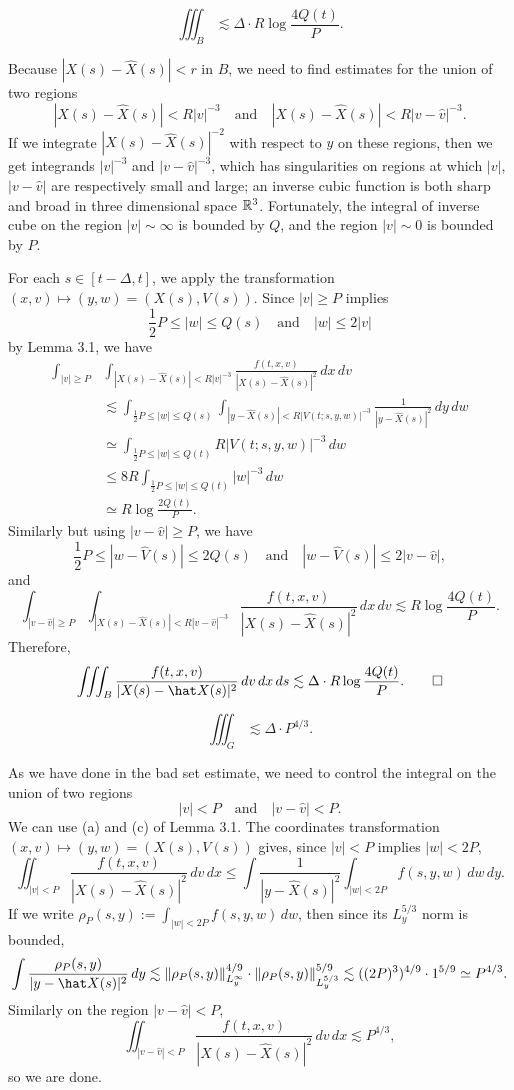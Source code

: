 \documentclass{article}
\begin{document}
\begin{prop}
\[\iiint_B\lesssim\Delta\cdot R\log\frac{4Q(t)}P.\]
\end{prop}
\begin{pf}
Because $|X(s)-\hat X(s)|<r$ in $B$, we need to find estimates for the union of two regions
\[|X(s)-\hat X(s)|<R|v|^{-3}\quad\text{and}\quad|X(s)-\hat X(s)|<R|v-\hat v|^{-3}.\]
If we integrate $|X(s)-\hat X(s)|^{-2}$ with respect to $y$ on these regions, then we get integrands $|v|^{-3}$ and $|v-\hat v|^{-3}$, which has singularities on regions at which $|v|$, $|v-\hat v|$ are respectively small and large; an inverse cubic function is both sharp and broad in three dimensional space $\mathbb{R}^3$.
Fortunately, the integral of inverse cube on the region $|v|\sim\infty$ is bounded by $Q$, and the region $|v|\sim0$ is bounded by $P$.

For each $s\in[t-\Delta,t]$, we apply the transformation $(x,v)\mapsto(y,w)=(X(s),V(s))$.
Since $|v|\ge P$ implies
\[\frac12P\le|w|\le Q(s)\quad\text{and}\quad|w|\le2|v|\]
by Lemma 3.1, we have
\begin{align*}
\int_{|v|\ge P}&\int_{|X(s)-\hat X(s)|<R|v|^{-3}}\frac{f(t,x,v)}{|X(s)-\hat X(s)|^2}\,dx\,dv\\
&\lesssim\int_{\frac12P\le|w|\le Q(s)}\int_{|y-\hat X(s)|<R|V(t;s,y,w)|^{-3}}\frac1{|y-\hat X(s)|^2}\,dy\,dw\\
&\simeq\int_{\frac12P\le|w|\le Q(t)}R|V(t;s,y,w)|^{-3}\,dw\\
&\le8R\int_{\frac12P\le|w|\le Q(t)}|w|^{-3}\,dw\\
&\simeq R\log\frac{2Q(t)}P.
\end{align*}
Similarly but using $|v-\hat v|\ge P$, we have
\[\frac12P\le|w-\hat V(s)|\le 2Q(s)\quad\text{and}\quad|w-\hat V(s)|\le2|v-\hat v|,\]
and
\[\int_{|v-\hat v|\ge P}\int_{|X(s)-\hat X(s)|<R|v-\hat v|^{-3}}\frac{f(t,x,v)}{|X(s)-\hat X(s)|^2}\,dx\,dv\lesssim R\log\frac{4Q(t)}P.\]
Therefore,
\[\iiint_B\frac{f(t,x,v)}{|X(s)-\hat X(s)|^2}\,dv\,dx\,ds\lesssim\Delta\cdot R\log\frac{4Q(t)}P.\qedhere\]
\end{pf}


\begin{prop}
\[\iiint_G\lesssim\Delta\cdot P^{4/3}.\]
\end{prop}
\begin{pf}
As we have done in the bad set estimate, we need to control the integral on the union of two regions
\[|v|<P\quad\text{and}\quad|v-\hat v|<P.\]
We can use (a) and (c) of Lemma 3.1.
The coordinates transformation $(x,v)\mapsto(y,w)=(X(s),V(s))$ gives, since $|v|<P$ implies $|w|<2P$,
\[\iint_{|v|<P}\frac{f(t,x,v)}{|X(s)-\hat X(s)|^2}\,dv\,dx
\le\int\frac1{|y-\hat X(s)|^2}\int_{|w|<2P}f(s,y,w)\,dw\,dy.\]
If we write $\rho_P(s,y):=\int_{|w|<2P}f(s,y,w)\,dw$, then since its $L_y^{5/3}$ norm is bounded,
\[\int\frac{\rho_P(s,y)}{|y-\hat X(s)|^2}\,dy
\lesssim\|\rho_P(s,y)\|_{L_y^\infty}^{4/9}\cdot\|\rho_P(s,y)\|_{L_y^{5/3}}^{5/9}\\
\lesssim((2P)^3)^{4/9}\cdot1^{5/9}\simeq P^{4/3}.\]
Similarly on the region $|v-\hat v|<P$,
\[\iint_{|v-\hat v|<P}\frac{f(t,x,v)}{|X(s)-\hat X(s)|^2}\,dv\,dx\lesssim P^{4/3},\]
so we are done.
\end{pf}
\end{document}
